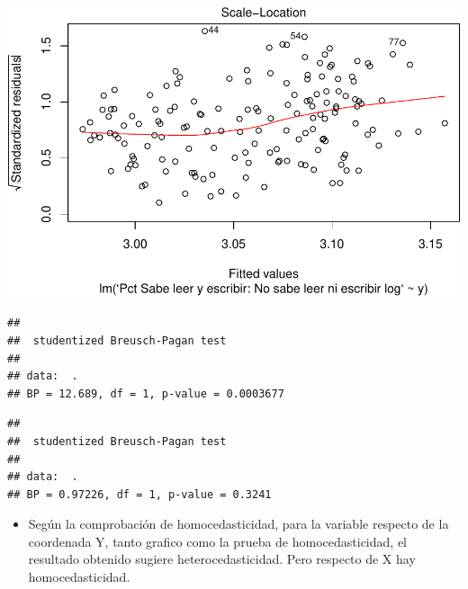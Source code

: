 \documentclass[11pt,]{article}
\newenvironment{Shaded}{\begin{snugshade}}{\end{snugshade}}
\newcommand{\KeywordTok}[1]{\textcolor[rgb]{0.13,0.29,0.53}{\textbf{#1}}}
\newcommand{\DataTypeTok}[1]{\textcolor[rgb]{0.13,0.29,0.53}{#1}}
\newcommand{\StringTok}[1]{\textcolor[rgb]{0.31,0.60,0.02}{#1}}
\newcommand{\OperatorTok}[1]{\textcolor[rgb]{0.81,0.36,0.00}{\textbf{#1}}}
\newcommand{\NormalTok}[1]{#1}
\providecommand{\tightlist}{%
\setlength{\itemsep}{0pt}\setlength{\parskip}{0pt}}
\begin{document}
\includegraphics{proyecto_files/figure-latex/unnamed-chunk-9-2.pdf}

\begin{Shaded}
\end{Shaded}

\begin{verbatim}
## 
##  studentized Breusch-Pagan test
## 
## data:  .
## BP = 12.689, df = 1, p-value = 0.0003677
\end{verbatim}

\begin{Shaded}
\end{Shaded}

\begin{verbatim}
## 
##  studentized Breusch-Pagan test
## 
## data:  .
## BP = 0.97226, df = 1, p-value = 0.3241
\end{verbatim}

\begin{itemize}
\tightlist
\item
  Según la comprobación de homocedasticidad, para la variable respecto
  de la coordenada Y, tanto grafico como la prueba de homocedasticidad,
  el resultado obtenido sugiere heterocedasticidad. Pero respecto de X
  hay homocedasticidad.
\end{itemize}
\end{document}
